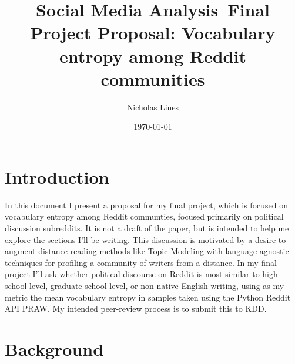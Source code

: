 \documentclass{amsart}
\theoremstyle{definition}
\theoremstyle{plain}
\numberwithin{equation}{section}
\begin{document}
\title[Proposal: Vocabulary entropy among Reddit communities]{Social Media
Analysis\ Final Project Proposal: Vocabulary entropy among Reddit communities%
}
\author{Nicholas Lines}
\date{\today }
\maketitle

\section{Introduction}

In this document I present a proposal for my final project, which is focused
on vocabulary entropy among Reddit communties, focused primarily on
political discussion subreddits. It is not a draft of the paper, but is
intended to help me explore the sections I'll be writing. This discussion is
motivated by a desire to augment distance-reading methods like Topic
Modeling with language-agnostic techniques for profiling a community of
writers from a distance. In my final project I'll ask whether political
discourse on Reddit is most similar to high-school level, graduate-school
level, or non-native English writing, using as my metric the mean vocabulary
entropy in samples taken using the Python Reddit API PRAW. My intended
peer-review process is to submit this to KDD.

\section{Background}
\end{document}
